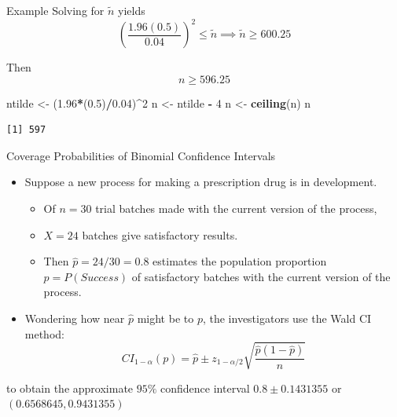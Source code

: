 \documentclass[
  ignorenonframetext,
]{beamer}
\newenvironment{Shaded}{\begin{snugshade}}{\end{snugshade}}
\newcommand{\DecValTok}[1]{\textcolor[rgb]{0.00,0.00,0.81}{#1}}
\newcommand{\FloatTok}[1]{\textcolor[rgb]{0.00,0.00,0.81}{#1}}
\newcommand{\FunctionTok}[1]{\textcolor[rgb]{0.13,0.29,0.53}{\textbf{#1}}}
\newcommand{\NormalTok}[1]{#1}
\newcommand{\OtherTok}[1]{\textcolor[rgb]{0.56,0.35,0.01}{#1}}
\newcommand{\SpecialCharTok}[1]{\textcolor[rgb]{0.81,0.36,0.00}{\textbf{#1}}}
\providecommand{\tightlist}{%
  \setlength{\itemsep}{0pt}\setlength{\parskip}{0pt}}
\begin{document}
\begin{frame}[fragile]{Example}
\label{example-4}
Solving for \(\tilde{n}\) yields
\[\left(\frac{1.96(0.5)}{0.04}\right)^2\leq \tilde{n} \implies \tilde{n}\geq 600.25\]

Then \[n\geq 596.25\] \tiny

\begin{Shaded}
\begin{Highlighting}[]
\NormalTok{ntilde }\OtherTok{\textless{}{-}}\NormalTok{ (}\FloatTok{1.96}\SpecialCharTok{*}\NormalTok{(}\FloatTok{0.5}\NormalTok{)}\SpecialCharTok{/}\FloatTok{0.04}\NormalTok{)}\SpecialCharTok{\^{}}\DecValTok{2}
\NormalTok{n }\OtherTok{\textless{}{-}}\NormalTok{ ntilde }\SpecialCharTok{{-}} \DecValTok{4}
\NormalTok{n }\OtherTok{\textless{}{-}} \FunctionTok{ceiling}\NormalTok{(n)}
\NormalTok{n}
\end{Highlighting}
\end{Shaded}

\begin{verbatim}
[1] 597
\end{verbatim}

\normalsize
\end{frame}

\begin{frame}{Coverage Probabilities of Binomial Confidence Intervals}
\label{coverage-probabilities-of-binomial-confidence-intervals}
\begin{itemize}
\item
  Suppose a new process for making a prescription drug is in
  development.

  \begin{itemize}
  \tightlist
  \item
    Of \(n=30\) trial batches made with the current version of the
    process,
  \item
    \(X=24\) batches give satisfactory results.
  \item
    Then \(\hat{p}=24/30=0.8\) estimates the population proportion
    \(p=P(Success)\) of satisfactory batches with the current version of
    the process.
  \end{itemize}
\item
  Wondering how near \(\hat{p}\) might be to \(p\), the investigators
  use the Wald CI method:
  \[CI_{1 - \alpha}(p) =\hat{p}\pm z_{1-\alpha/2}\sqrt{\frac{\hat{p}(1-\hat{p})}{n}}\]
\end{itemize}

to obtain the approximate \(95\%\) confidence interval
\(0.8 \pm 0.1431355\) or \((0.6568645, 0.9431355)\)
\end{frame}
\end{document}
